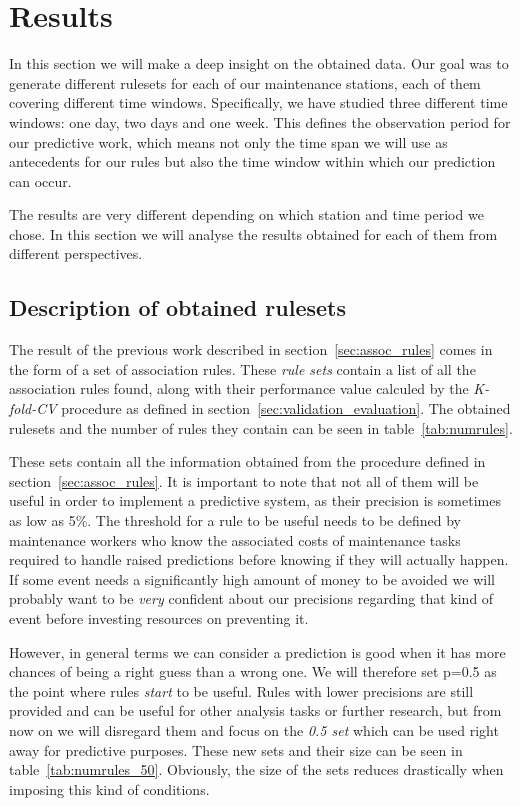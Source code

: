 \documentclass[a4paper,12pt]{article}
\begin{document}
\clearpage
\section{Results}
\label{sec:results}
In this section we will make a deep insight on the obtained data. Our goal was to generate different rulesets for each of our maintenance stations, each of them covering different time windows. Specifically, we have studied three different time windows: one day, two days and one week. This defines the observation period for our predictive work, which means not only the time span we will use as antecedents for our rules but also the time window within which our prediction can occur.

The results are very different depending on which station and time period we chose. In this section we will analyse the results obtained for each of them from different perspectives.

\subsection{Description of obtained rulesets}
\label{sec:desc_results}
The result of the previous work described in section~\ref{sec:assoc_rules} comes in the form of a set of association rules. These \emph{rule sets} contain a list of all the association rules found, along with their performance value calculed by the \emph{K-fold-CV} procedure as defined in section~\ref{sec:validation_evaluation}. The obtained rulesets and the number of rules they contain can be seen in table~\ref{tab:numrules}.

These sets contain all the information obtained from the procedure defined in section~\ref{sec:assoc_rules}. It is important to note that not all of them will be useful in order to implement a predictive system, as their precision is sometimes as low as 5\%. The threshold for a rule to be useful needs to be defined by maintenance workers who know the associated costs of maintenance tasks required to handle raised predictions before knowing if they will actually happen. If some event needs a significantly high amount of money to be avoided we will probably want to be \emph{very} confident about our precisions regarding that kind of event before investing resources on preventing it.

However, in general terms we can consider a prediction is good when it has more chances of being a right guess than a wrong one. We will therefore set p=0.5 as the point where rules \emph{start} to be useful. Rules with lower precisions are still provided and can be useful for other analysis tasks or further research, but from now on we will disregard them and focus on the \emph{0.5 set} which can be used right away for predictive purposes. These new sets and their size can be seen in table~\ref{tab:numrules_50}. Obviously, the size of the sets reduces drastically when imposing this kind of conditions.
\end{document}
